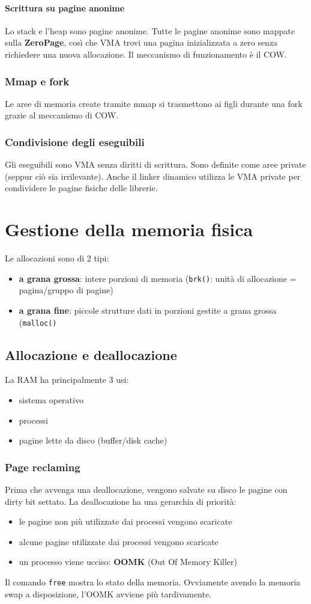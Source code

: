 \documentclass[12pt, a4paper]{report}
\begin{document}
\subsubsection{Scrittura su pagine anonime}
Lo stack e l'heap sono pagine anonime. Tutte le pagine anonime sono mappate
sulla \textbf{ZeroPage}, così che VMA trovi una pagina inizializzata a zero
senza richiedere una nuova allocazione. Il meccanismo di funzionamento è il COW.

\subsection{Mmap e fork}
Le aree di memoria create tramite mmap si trasmettono ai figli durante una fork
grazie al meccanismo di COW.

\subsection{Condivisione degli eseguibili}
Gli eseguibili sono VMA senza diritti di scrittura. Sono definite come aree
private (seppur ciò sia irrilevante). Anche il linker dinamico utilizza le VMA
private per condividere le pagine fisiche delle librerie.

\chapter{Gestione della memoria fisica}
Le allocazioni sono di 2 tipi:
\begin{itemize}
	\item \textbf{a grana grossa}: intere porzioni di memoria (\texttt{brk()}:
		unità di allocazione = pagina/gruppo di pagine)
	\item \textbf{a grana fine}: piccole strutture dati in porzioni gestite a
		grana grossa (\texttt{malloc()}
\end{itemize}
\section{Allocazione e deallocazione}
La RAM ha principalmente 3 usi:
\begin{itemize}
	\item sistema operativo
	\item processi
	\item pagine lette da disco (buffer/disk cache)
\end{itemize}
\subsection{Page reclaming}
Prima che avvenga una deallocazione, vengono salvate su disco le pagine con dirty
bit settato.
La deallocazione ha una gerarchia di priorità:
\begin{itemize}
	\item le pagine non più utilizzate dai processi vengono scaricate
	\item alcune pagine utilizzate dai processi vengono scaricate
	\item un processo viene ucciso: \textbf{OOMK} (Out Of Memory Killer)
\end{itemize}
Il comando \texttt{free} mostra lo stato della memoria.
Ovviamente avendo la memoria swap a disposizione, l'OOMK avviene più
tardivamente.
\end{document}
